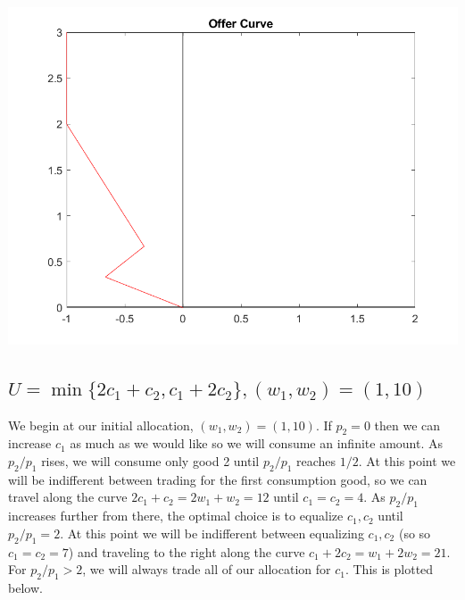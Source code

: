 \documentclass[11pt]{article} %
\begin{document}
\includegraphics{off2}


\subsection{$U = \min \{ 2c_1 + c_2, c_1 + 2 c_2\}, (w_1,w_2) = (1,10)$}
We begin at our initial allocation, $(w_1,w_2) = (1,10).$ If $p_2 = 0$ then we can increase $c_1$ as much as we would like so we will consume an infinite amount. As $p_2/p_1$ rises, we will consume only good 2 until $p_2/p_1$ reaches $1/2$. At this point we will be indifferent between trading for the first consumption good, so we can travel along the curve $2c_1 + c_2 = 2w_1 + w_2 = 12$ until $c_1 = c_2 = 4$. As $p_2/p_1$ increases further from there, the optimal choice is to equalize $c_1,c_2$ until $p_2/p_1 = 2$. At this point we will be indifferent between equalizing $c_1,c_2$ (so so $c_1 = c_2 = 7$) and traveling to the right along the curve $c_1 +2c_2 = w_1 +2w_2 = 21$. For $p_2/p_1>2$, we will always trade all of our allocation for $c_1$. This is plotted below.
\end{document}
